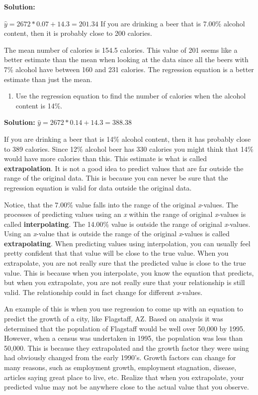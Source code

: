 \documentclass[
]{book}
\providecommand{\tightlist}{%
  \setlength{\itemsep}{0pt}\setlength{\parskip}{0pt}}
\begin{document}
\textbf{Solution:}

\(\hat{y}=2672*0.07+14.3=201.34\) If you are drinking a beer that is 7.00\% alcohol content, then it is probably close to 200 calories.

The mean number of calories is 154.5 calories. This value of 201 seems like a better estimate than the mean when looking at the data since all the beers with 7\% alcohol have between 160 and 231 calories. The regression equation is a better estimate than just the mean.

\begin{enumerate}
\def\labelenumi{\alph{enumi}.}
\setcounter{enumi}{2}
\tightlist
\item
  Use the regression equation to find the number of calories when the alcohol content is 14\%.
\end{enumerate}

\textbf{Solution:}
\(\hat{y}=2672*0.14+14.3=388.38\)

If you are drinking a beer that is 14\% alcohol content, then it has probably close to 389 calories. Since 12\% alcohol beer has 330 calories you might think that 14\% would have more calories than this. This estimate is what is called \textbf{extrapolation}. It is not a good idea to predict values that are far outside the range of the original data. This is because you can never be sure that the regression equation is valid for data outside the original data.

Notice, that the 7.00\% value falls into the range of the original \emph{x}-values. The processes of predicting values using an \emph{x} within the range of original \emph{x}-values is called \textbf{interpolating}. The 14.00\% value is outside the range of original \emph{x}-values. Using an \emph{x}-value that is outside the range of the original \emph{x}-values is called \textbf{extrapolating}. When predicting values using interpolation, you can usually feel pretty confident that that value will be close to the true value. When you extrapolate, you are not really sure that the predicted value is close to the true value. This is because when you interpolate, you know the equation that predicts, but when you extrapolate, you are not really sure that your relationship is still valid. The relationship could in fact change for different \emph{x}-values.

An example of this is when you use regression to come up with an equation to predict the growth of a city, like Flagstaff, AZ. Based on analysis it was determined that the population of Flagstaff would be well over 50,000 by 1995. However, when a census was undertaken in 1995, the population was less than 50,000. This is because they extrapolated and the growth factor they were using had obviously changed from the early 1990's. Growth factors can change for many reasons, such as employment growth, employment stagnation, disease, articles saying great place to live, etc. Realize that when you extrapolate, your predicted value may not be anywhere close to the actual value that you observe.
\end{document}
